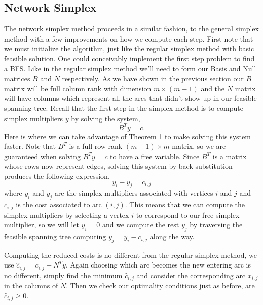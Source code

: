 \documentclass[12pt]{amsart}
\begin{document}
\subsection{Network Simplex} 
The network simplex method proceeds in a similar fashion, to the general simplex method with a few improvements on how we 
compute each step. First note that we must initialize the algorithm, just like the regular simplex method with basic feasible solution. One could 
conceivably implement the first step problem to find a BFS. Like in the regular simplex method we'll need to form our Basis and Null matrices $B$ and $N$
respectively. As we have shown in the previous section our $B$ matrix will be full column rank with dimension $m \times (m - 1)$ and the $N$ matrix 
will have columns which represent all the arcs that didn't show up in our feasible spanning tree. Recall that the first step in the simplex method is to compute
simplex multipliers $y$ by solving the system, 
\begin{equation*}
    B^Ty = c.
\end{equation*}
Here is where we can take advantage of Theorem 1 to make solving this system faster. Note that $B^T$ is a full row 
rank $(m - 1) \times m$ matrix, so we are guaranteed when solving $B^Ty = c$ to have a free variable. Since $B^T$ is 
a matrix whose rows now represent edges, solving this system by back substitution produces the following expression, 
\begin{equation*}
    y_i - y_j = c_{i, j}
\end{equation*} 
where $y_i$ and $y_j$ are the simplex multipliers associated with vertices $i$ and $j$ and $c_{i, j}$ is the cost associated to 
arc $(i, j)$. This means that we can compute the simplex multipliers by selecting a vertex $i$ to correspond to our free simplex multiplier, so we will let $y_i = 0$ 
and we compute the rest $y_j$ by traversing the feasible spanning tree computing $y_j = y_i - c_{i,j}$ along the way.  


Computing the reduced costs is no different from the regular simplex method, we use $\hat{c}_{i, j} = c_{i, j} - N^Ty$. Again choosing which arc becomes the new entering arc is no different, 
simply find the minimum $\hat{c}_{i, j}$ and consider the corresponding arc $x_{i, j}$ in the columns of $N$. Then we check our optimality conditions just as before, are $\hat{c}_{i, j} \geq 0$. 
\end{document}
